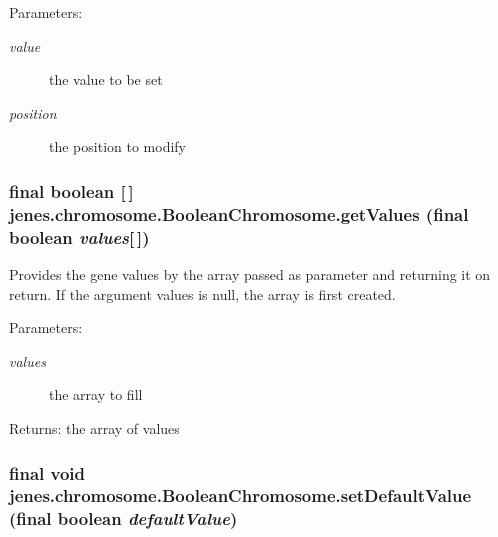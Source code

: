 \begin{Desc}
\item[Parameters:]
\begin{description}
\item[{\em value}]the value to be set \item[{\em position}]the position to modify \end{description}
\end{Desc}
\hypertarget{classjenes_1_1chromosome_1_1_boolean_chromosome_afccb6ebf217d02c0502e185b1972f82}{
\subsubsection[getValues]{\setlength{\rightskip}{0pt plus 5cm}final boolean \mbox{[}$\,$\mbox{]} jenes.chromosome.BooleanChromosome.getValues (final boolean {\em values}\mbox{[}$\,$\mbox{]})}}
\label{classjenes_1_1chromosome_1_1_boolean_chromosome_afccb6ebf217d02c0502e185b1972f82}


Provides the gene values by the array passed as parameter and returning it on return. If the argument values is null, the array is first created. 

\begin{Desc}
\item[Parameters:]
\begin{description}
\item[{\em values}]the array to fill \end{description}
\end{Desc}
\begin{Desc}
\item[Returns:]the array of values \end{Desc}
\hypertarget{classjenes_1_1chromosome_1_1_boolean_chromosome_3730cbcd4d048349f134593db820566d}{
\subsubsection[setDefaultValue]{\setlength{\rightskip}{0pt plus 5cm}final void jenes.chromosome.BooleanChromosome.setDefaultValue (final boolean {\em defaultValue})}}
\label{classjenes_1_1chromosome_1_1_boolean_chromosome_3730cbcd4d048349f134593db820566d}


